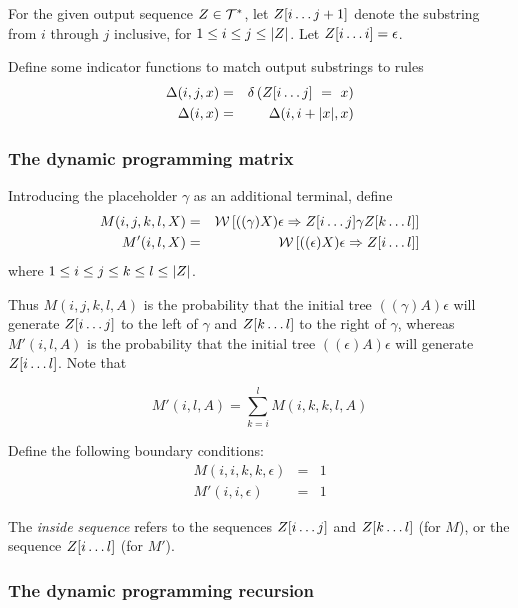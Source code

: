 \documentclass[10pt]{article}
\begin{document}
For the given output sequence $Z \in {\cal T}^\ast$, let $Z[i \ldots j+1]$ denote the substring from $i$ through $j$ inclusive, for $1 \leq i \leq j \leq |Z|$.
Let $Z[i \ldots i] = \epsilon$.

Define some indicator functions to match output substrings to rules
\begin{eqnarray*}
\Delta(i,j,x) & = & \delta \left( Z[i \ldots j]\ =\ x \right) \\
\Delta(i,x) & = & \Delta(i,i+|x|,x)
\end{eqnarray*}

\subsubsection{The dynamic programming matrix}

\newcommand\m{M}
\newcommand\mtip{\m'}

Introducing the placeholder $\gamma$ as an additional terminal, define
\begin{eqnarray*}
\m(i,j,k,l,X) & = & \seqweight{((\gamma)X)\epsilon}{\outsubseq{i}{j} \gamma \outsubseq{k}{l}} \\
\mtip(i,l,X) & = & \seqweight{((\epsilon)X)\epsilon}{\outsubseq{i}{l}}
\end{eqnarray*}
where $1 \leq i \leq j \leq k \leq l \leq |Z|$.

Thus $\m(i,j,k,l,A)$ is the probability that the initial tree $((\gamma)A)\epsilon$ will generate 
$Z[i \ldots j]$ to the left of $\gamma$ and $Z[k \ldots l]$ to the right of $\gamma$,
whereas $\mtip(i,l,A)$ is the probability that the initial tree $((\epsilon)A)\epsilon$ will generate 
$Z[i \ldots l]$.
Note that

\[
\mtip(i,l,A) = \sum_{k=i}^l \m(i,k,k,l,A)
\]

Define the following boundary conditions:
\begin{eqnarray*}
\m(i,i,k,k,\epsilon) & = & 1 \\
\mtip(i,i,\epsilon) & = & 1
\end{eqnarray*}

The {\em inside sequence} refers to the sequences $Z[i \ldots j]$ and $Z[k \ldots l]$ (for $\m$),
or the sequence $Z[i \ldots l]$ (for $\mtip$).

\subsubsection{The dynamic programming recursion}
\end{document}
